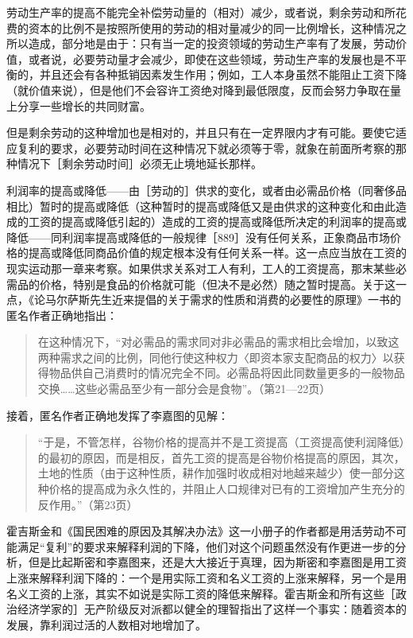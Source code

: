 劳动生产率的提高不能完全补偿劳动量的（相对）减少，或者说，剩余劳动和所花费的资本的比例不是按照所使用的劳动的相对量减少的同一比例增长，这种情况之所以造成，部分地是由于：只有当一定的投资领域的劳动生产率有了发展，劳动价值，或者说，必要劳动量才会减少，即使在这些领域，劳动生产率的发展也是不平衡的，并且还会有各种抵销因素发生作用；例如，工人本身虽然不能阻止工资下降（就价值来说），但是他们不会容许工资绝对降到最低限度，反而会努力争取在量上分享一些增长的共同财富。

但是剩余劳动的这种增加也是相对的，并且只有在一定界限内才有可能。要使它适应复利的要求，必要劳动时间在这种情况下就必须等于零，就象在前面所考察的那种情况下［剩余劳动时间］必须无止境地延长那样。

利润率的提高或降低——由［劳动的］供求的变化，或者由必需品价格（同奢侈品相比）暂时的提高或降低（这种暂时的提高或降低又是由供求的这种变化和由此造成的工资的提高或降低引起的）造成的工资的提高或降低所决定的利润率的提高或降低——同利润率提高或降低的一般规律［889］没有任何关系，正象商品市场价格的提高或降低同商品价值的规定根本没有任何关系一样。这一点应当放在工资的现实运动那一章来考察。如果供求关系对工人有利，工人的工资提高，那末某些必需品的价格，特别是食品的价格就可能（但决不是必然）随之暂时提高。关于这一点，《论马尔萨斯先生近来提倡的关于需求的性质和消费的必要性的原理》一书的匿名作者正确地指出：

\begin{quote}{在这种情况下，“对必需品的需求同对非必需品的需求相比会增加，以致这两种需求之间的比例，同他行使这种权力〈即资本家支配商品的权力〉以获得物品供自己消费时的情况完全不同。必需品将因此同数量更多的一般物品交换……这些必需品至少有一部分会是食物”。（第21—22页）}\end{quote}

接着，匿名作者正确地发挥了李嘉图的见解：

\begin{quote}{“于是，不管怎样，谷物价格的提高并不是工资提高（工资提高使利润降低）的最初的原因，而是相反，首先工资的提高是谷物价格提高的原因，其次，土地的性质（由于这种性质，耕作加强时收成相对地越来越少）使一部分这种价格的提高成为永久性的，并阻止人口规律对已有的工资增加产生充分的反作用。”（第23页）}\end{quote}

霍吉斯金和《国民困难的原因及其解决办法》这一小册子的作者都是用活劳动不可能满足“复利”的要求来解释利润的下降，他们对这个问题虽然没有作更进一步的分析，但是比起斯密和李嘉图来，还是大大接近于真理，因为斯密和李嘉图是用工资上涨来解释利润下降的：一个是用实际工资和名义工资的上涨来解释，另一个是用名义工资的上涨，其实不如说是实际工资的降低来解释。霍吉斯金和所有这些［政治经济学家的］无产阶级反对派都以健全的理智指出了这样一个事实：随着资本的发展，靠利润过活的人数相对地增加了。

